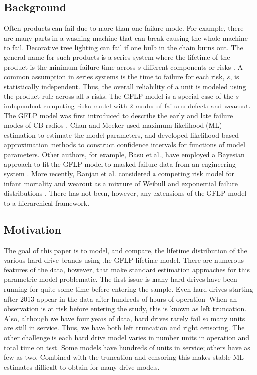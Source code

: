 \documentclass[12pt]{article}
\begin{document}
\subsection{Background}
Often products can fail due to more than one failure mode.  For example, there are many parts in a washing machine that can break causing the whole machine to fail.  Decorative tree lighting can fail if one bulb in the chain burns out.  The general name for such products is a series system where the lifetime of the product is the minimum failure time across $s$ different components or risks \cite{nelson}.  A common assumption in series systems is the time to failure for each risk, $s$, is statistically independent.  Thus, the overall reliability of a unit is modeled using the product rule across all $s$ risks.  The GFLP model is a special case of the $s$ independent competing risks model with 2 modes of failure: defects and wearout.  The GFLP model was first introduced to describe the early and late failure modes of CB radios \cite{chan}.  Chan and Meeker used maximum likelihood (ML) estimation to estimate the model parameters, and developed likelihood based approximation methods to construct confidence intervals for functions of model parameters.  Other authors, for example, Basu et al., have employed a Bayesian approach to fit the GFLP model to masked failure data from an engineering system \cite{basu}.  More recently, Ranjan et al. considered a competing risk model for infant mortality and wearout as a mixture of Weibull and exponential failure distributions \cite{ranjan}.  There has not been, however, any extensions of the GFLP model to a hierarchical framework.   
 
\subsection{Motivation}
The goal of this paper is to model, and compare, the lifetime distribution of the various hard drive brands using the GFLP lifetime model.  There are numerous features of the data, however, that make standard estimation approaches for this parametric model problematic.  The first issue is many hard drives have been running for quite some time before entering the sample.  Even hard drives starting after 2013 appear in the data after hundreds of hours of operation.  When an observation is at risk before entering the study, this is known as left truncation.  Also, although we have four years of data, hard drives rarely fail so many units are still in service.  Thus, we have both left truncation and right censoring.  The other challenge is each hard drive model varies in number units in operation and total time on test.  Some models have hundreds of units in service; others have as few as two.  Combined with the truncation and censoring this makes stable ML estimates difficult to obtain for many drive models. \\
\end{document}
